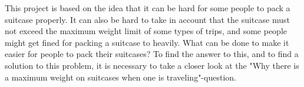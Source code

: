 This project is based on the idea that it can be hard for some people to pack a suitcase properly. It can also be hard to take in account that the suitcase must not exceed the maximum weight limit of some types of trips, and some people might get fined for packing a suitcase to heavily. What can be done to make it easier for people to pack their suitcases? To find the answer to this, and to find a solution to this problem, it is necessary to take a closer look at the "Why there is a maximum weight on suitcases when one is traveling"-question.